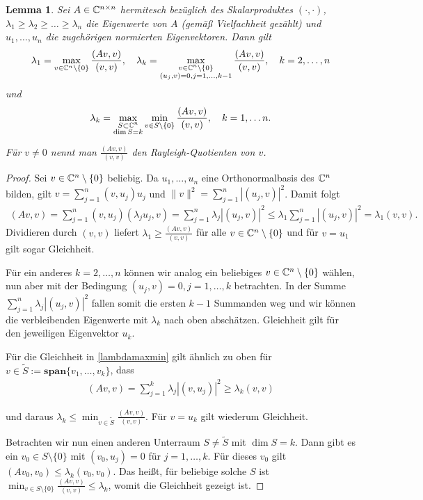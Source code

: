 \documentclass{article}
\theoremstyle{plain}
\newtheorem{lemma}      [theorem]{Lemma}
\begin{document}
\begin{lemma} \label{Rayleigh}
	Sei $A \in \mathbb{C}^{n \times n}$ hermitesch bezüglich des Skalarproduktes $(\cdot, \cdot)$, $\lambda_1 \geq \lambda_2 \geq \dots \geq \lambda_n$ die Eigenwerte von $A$ (gemäß Vielfachheit gezählt) und $u_1, \dots, u_n$ die zugehörigen normierten Eigenvektoren. Dann gilt
	\begin{align}\label{lambdamax}
		\lambda_1 = \max_{v \in \mathbb{C}^n \setminus \{0\}} \frac{(Av,v)}{(v,v)}, \quad \lambda_k = \max_{\substack{v \in \mathbb{C}^n \setminus \{0\}\\
    (u_j,v) = 0, j= 1,\dots, k-1}} \frac{(Av,v)}{(v,v)}, \quad k= 2, \dots, n
	\end{align}
	und
	\begin{align}\label{lambdamaxmin}
		\lambda_k = \max_{\substack{S \subset \mathbb{C}^n\\
    \dim S = k}} \min_{v \in S \setminus \{0\}} \frac{(Av,v)}{(v,v)}, \quad k=1, \dots n.
	\end{align}

	Für $v \neq 0$ nennt man $\frac{(Av,v)}{(v,v)}$ den Rayleigh-Quotienten von $v$.
\end{lemma}

\begin{proof}
	Sei $v \in \mathbb{C}^n \setminus \{0\}$ beliebig. Da $u_1, \dots, u_n$ eine Orthonormalbasis des $\mathbb{C}^n$ bilden, gilt $ v = \sum_{j=1}^{n} (v,u_j) u_j$ und $\|v\|^2 = \sum_{j=1}^{n} |(u_j,v)|^2$. Damit folgt
	\begin{align*}
		(Av,v) = \sum_{j=1}^{n} (v,u_j) (\lambda_j u_j,v) = \sum_{j=1}^{n} \lambda_j |(u_j,v)|^2 \leq \lambda_1 \sum_{j=1}^{n} |(u_j,v)|^2 = \lambda_1 (v,v).
	\end{align*}
	Dividieren durch $(v,v)$ liefert $\lambda_1 \geq \frac{(Av,v)}{(v,v)}$ für alle $v \in \mathbb{C}^n \setminus \{0\}$ und für $v = u_1$ gilt sogar Gleichheit.

	Für ein anderes $k = 2,\dots,n$ können wir analog ein beliebiges $v \in \mathbb{C}^n \setminus \{0\}$ wählen, nun aber mit der Bedingung $(u_j,v) = 0, j=1,\dots,k$ betrachten. In der Summe $\sum_{j=1}^{n} \lambda_j |(u_j,v)|^2$ fallen somit die ersten $k-1$ Summanden weg und wir können die verbleibenden Eigenwerte mit $\lambda_k$ nach oben abschätzen. Gleichheit gilt für den jeweiligen Eigenvektor $u_k$.

	Für die Gleichheit in \ref{lambdamaxmin} gilt ähnlich zu oben für $v \in \tilde{S} := \textbf{span}\{v_1, \dots, v_k\}$, dass
	\begin{align*}
		(Av,v) = \sum_{j=1}^{k} \lambda_j |(v,u_j)|^2 \geq \lambda_k (v,v)
	\end{align*}

	und daraus $\lambda_k \leq \min_{v \in \tilde{S}} \frac{(Av,v)}{(v,v)}$. Für $v = u_k$ gilt wiederum Gleichheit.

	Betrachten wir nun einen anderen Unterraum $S \neq \tilde{S}$ mit $\dim S = k$. Dann gibt es ein $v_0 \in S \setminus \{0\}$ mit $(v_0,u_j) = 0$ für $j=1,\dots,k$. Für dieses $v_0$ gilt $(Av_0,v_0) \leq \lambda_k (v_0,v_0)$. Das heißt, für beliebige solche $S$ ist $\min_{v \in S \setminus \{0\}} \frac{(Av,v)}{(v,v)} \leq \lambda_k$, womit die Gleichheit gezeigt ist.
\end{proof}
\end{document}
